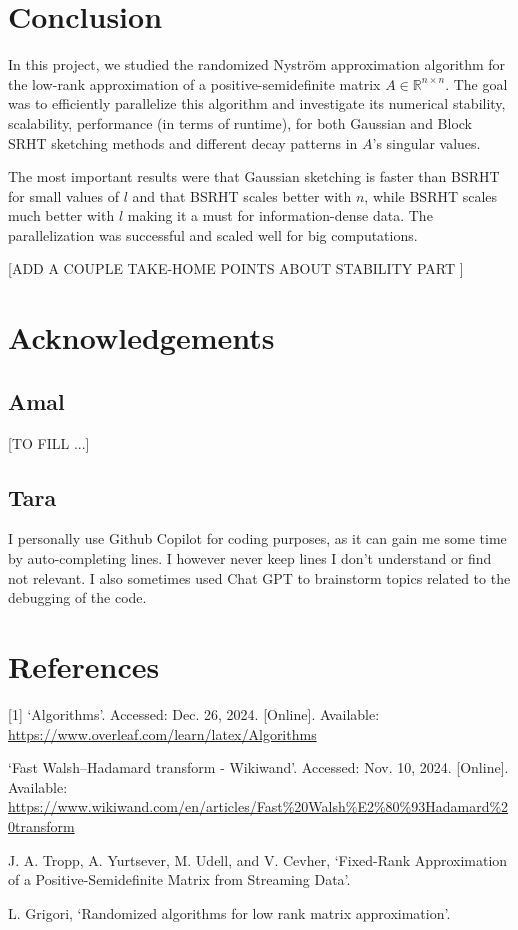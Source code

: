 \documentclass[a4paper, 12pt,oneside]{article}
\begin{document}
	\section{Conclusion}
	In this project, we studied the randomized Nystr\"om approximation algorithm for the low-rank approximation of a positive-semidefinite matrix $A \in \mathbb{R}^{n \times n}$. The goal was to efficiently parallelize this algorithm and investigate its numerical stability, scalability, performance (in terms of runtime), for both Gaussian and Block SRHT sketching methods and different decay patterns in $A$'s singular values. 

	The most important results were that Gaussian sketching is faster than BSRHT for small values of $l$ and that BSRHT scales better with $n$, while BSRHT scales much better with $l$ making it a must for information-dense data. The parallelization was successful and scaled well for big computations. 
	
	[ADD A COUPLE TAKE-HOME POINTS ABOUT STABILITY PART ]
	\section*{Acknowledgements}
	\subsection{Amal}
	[TO FILL ...]
	\subsection{Tara}
		I personally use Github Copilot for coding purposes, as it can gain me some time by auto-completing lines. I however never keep lines I don't understand or find not relevant. I also sometimes used Chat GPT to brainstorm topics related to the debugging of the code.	
	\section*{References}
	[1] ‘Algorithms’. Accessed: Dec. 26, 2024. [Online]. Available: \url{https://www.overleaf.com/learn/latex/Algorithms}

	\noindent
	[2] ‘Fast Walsh–Hadamard transform - Wikiwand’. Accessed: Nov. 10, 2024. [Online]. Available: \url{https://www.wikiwand.com/en/articles/Fast%20Walsh%E2%80%93Hadamard%20transform}
	
	\noindent
	[3] J. A. Tropp, A. Yurtsever, M. Udell, and V. Cevher, ‘Fixed-Rank Approximation of a Positive-Semidefinite Matrix from Streaming Data’.
	
	\noindent
	[4] L. Grigori, ‘Randomized algorithms for low rank matrix approximation’.
\end{document}
